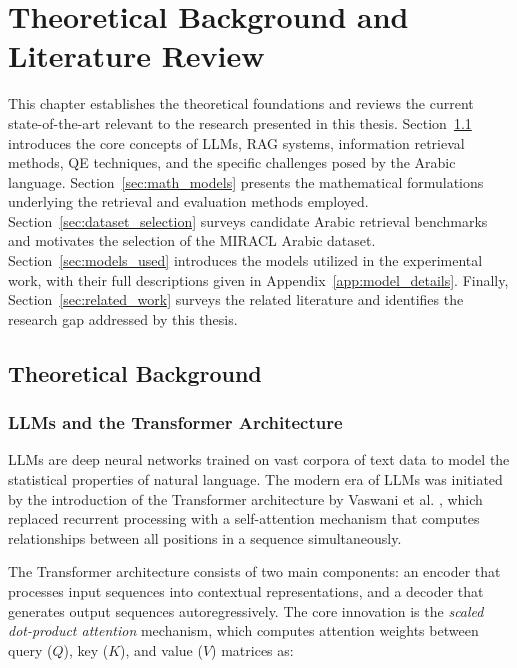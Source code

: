 \chapter{Theoretical Background and Literature Review}
\label{chap:background}

This chapter establishes the theoretical foundations and reviews the current state-of-the-art relevant to the research presented in this thesis. Section~\ref{sec:theoretical} introduces the core concepts of LLMs, RAG systems, information retrieval methods, QE techniques, and the specific challenges posed by the Arabic language. Section~\ref{sec:math_models} presents the mathematical formulations underlying the retrieval and evaluation methods employed. Section~\ref{sec:dataset_selection} surveys candidate Arabic retrieval benchmarks and motivates the selection of the MIRACL Arabic dataset. Section~\ref{sec:models_used} introduces the models utilized in the experimental work, with their full descriptions given in Appendix~\ref{app:model_details}. Finally, Section~\ref{sec:related_work} surveys the related literature and identifies the research gap addressed by this thesis.

\section{Theoretical Background}
\label{sec:theoretical}

\subsection{LLMs and the Transformer Architecture}
\label{sec:llm_transformer}

LLMs are deep neural networks trained on vast corpora of text data to model the statistical properties of natural language. The modern era of LLMs was initiated by the introduction of the Transformer architecture by Vaswani et al. \cite{vaswani_2017_attention}, which replaced recurrent processing with a self-attention mechanism that computes relationships between all positions in a sequence simultaneously.

The Transformer architecture consists of two main components: an encoder that processes input sequences into contextual representations, and a decoder that generates output sequences autoregressively. The core innovation is the \textit{scaled dot-product attention} mechanism, which computes attention weights between query ($Q$), key ($K$), and value ($V$) matrices as:

